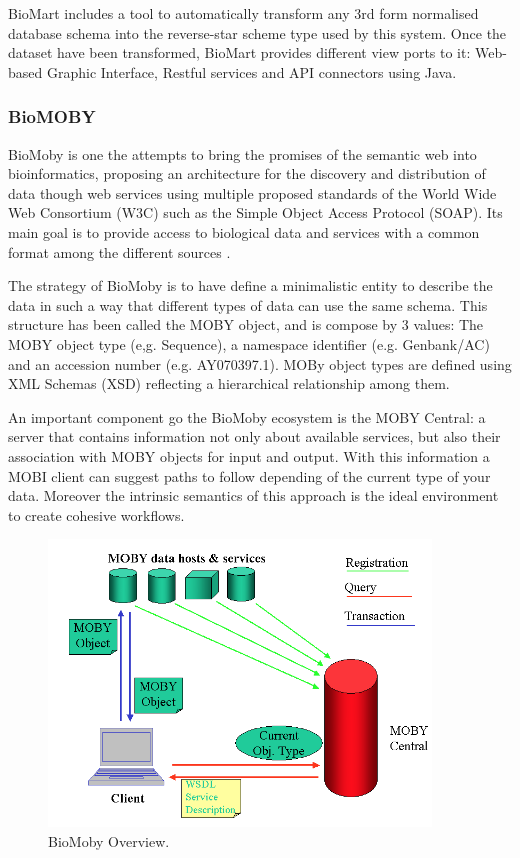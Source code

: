 BioMart includes a tool to automatically transform any 3rd form normalised database schema into the reverse-star scheme type used by this system. Once the dataset have been transformed, BioMart provides different view ports to it: Web-based Graphic Interface, Restful services and API connectors using Java.

\subsubsection{BioMOBY}
BioMoby is one the attempts to bring the promises of the semantic web into bioinformatics, proposing an architecture for the discovery and distribution of data though web services using multiple proposed standards of the World Wide Web Consortium (W3C) such as the Simple Object Access Protocol (SOAP). Its main goal is to provide access to biological data and services with a common format among the different sources \cite{WIL2002}.

The strategy of BioMoby is to have define a minimalistic entity to describe the data in such a way that different types of data can use the same schema.
This structure has been called the MOBY object, and is compose by 3 values: The MOBY object type (e,g. Sequence), a namespace identifier (e.g. Genbank/AC) and an accession number (e.g. AY070397.1). MOBy object types are defined using XML Schemas (XSD) reflecting a hierarchical relationship among them.

An important component go the BioMoby ecosystem is the MOBY Central: a server that contains information not only about available services, but also their association with MOBY objects for input and output. With this information a MOBI client can suggest paths to follow depending of the current type of your data. Moreover the intrinsic semantics of this approach is the ideal environment to create cohesive workflows.

\begin{figure}  
\centering
\includegraphics[width=4in]{figures/MOBY_Overview.png}
\caption[BioMoby Overview.]{BioMoby Overview.
\label{fig:biomoby}}
\end{figure}

